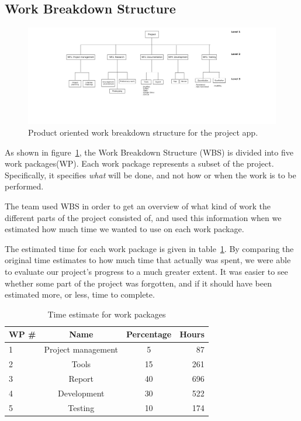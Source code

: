 
\subsection{Work Breakdown Structure}
\label{sec:wbs}

\begin{figure}[H]
\includegraphics[width=\textwidth, trim=9.5cm 6cm 8.5cm 0.9cm,clip]{ch/projectManagement/fig/wbs2.png}
\caption{Product oriented work breakdown structure for the project app.}
\label{fig:wbs}
\end{figure}

As shown in figure~\ref{fig:wbs}, the Work Breakdown Structure (WBS) is divided into five work packages(WP). Each work package represents a subset of the project. Specifically, it specifies \emph{what} will be done, and not how or when the work is to be performed.

The team used WBS in order to get an overview of what kind of work the different parts of the project consisted of, and used this information when we estimated how much time we wanted to use on each work package.

The estimated time for each work package is given in table~\ref{tab:timeEstWP}. By comparing the original time estimates to how much time that actually was spent, we were able to evaluate our project's progress to a much greater extent. It was easier to see whether some part of the project was forgotten, and if it should have been estimated more, or less, time to complete.

\begin{table}[H]
\centering
{}
\begin{tabular}{|l|c|c|r|}
\hline
    \textbf{WP \#} & \textbf{Name} & \textbf{Percentage} & \textbf{Hours} \\\hline
    1 & Project management & 5 & 87\\\hline
    2 & Tools 			   & 15 & 261\\\hline
    3 & Report 			   & 40 & 696\\\hline
    4 & Development 	   & 30 & 522\\\hline
    5 & Testing  		   & 10 & 174\\\hline
\end{tabular}
\caption{Time estimate for work packages}
\label{tab:timeEstWP}
\end{table}